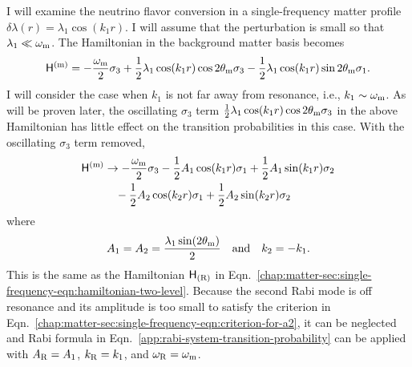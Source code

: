 I will examine the neutrino flavor conversion in a single-frequency matter profile $\delta\lambda(r) = \lambda_1 \cos(k_1 r)$. I will assume that the perturbation is small so that $\lambda_1 \ll \omega_\mathrm m$. The Hamiltonian in the background matter basis becomes
\begin{equation}
\mathsf H^{(\mm)} = - \frac{\omega_\mm}{2}\sigma_3  + \frac{1}{2} \lambda_1 \cos(k_1 r) \cos 2\theta_\mm \sigma_3 - \frac{1}{2} \lambda_1 \cos(k_1 r)\sin 2\theta_\mm \sigma_1.
\label{chap:matter-sec:single-fequency-eq:hamiltonian-bg-matter-basis-single-frequency}
\end{equation}
I will consider the case when $k_1$ is not far away from resonance, i.e., $k_1 \sim \omega_\mathrm m$. As will be proven later, the oscillating $\sigma_3$ term $\frac{1}{2} \lambda_1 \cos(k_1 r) \cos 2\theta_\mathrm m \sigma_3$ in the above Hamiltonian has little effect on the transition probabilities in this case. With the oscillating $\sigma_3$ term removed, 
\begin{align}
    \mathsf H^{(\mm)} &\to -\frac{\omega_{\mathrm m}}{2} \sigma_3  - \frac{1}{2} A_1 \cos ( k_1 r)  \sigma_1 + \frac{1}{2} A_1\sin(k_1 r) \sigma_2 \nonumber\\
    &\phantom{\to} - \frac{1}{2} A_2 \cos ( k_2 r)  \sigma_1 + \frac{1}{2} A_2\sin(k_2 r) \sigma_2  
    \label{eq-hamiltonian-bg-matter-basis-single-frequency}
\end{align}
where
\begin{align}
    A_1 = A_2 = \frac{\lambda_1 \sin(2\theta_\mathrm m) }{2} \quad \text{and} \quad k_2 = -k_1.
\end{align}
This is the same as the Hamiltonian $\mathsf H_{(\mathrm R)}$ in Eqn.~\ref{chap:matter-sec:single-frequency-eqn:hamiltonian-two-level}.
Because the second Rabi mode is off resonance and its amplitude is too small to satisfy the criterion in Eqn.~\ref{chap:matter-sec:single-frequency-eqn:criterion-for-a2}, it can be neglected and Rabi formula in Eqn.~\ref{app:rabi-system-transition-probability} can be applied with $A_\mathrm R=A_1$, $k_\mathrm R=k_1$, and $\omega_\mathrm R = \omega_\mathrm m$.

